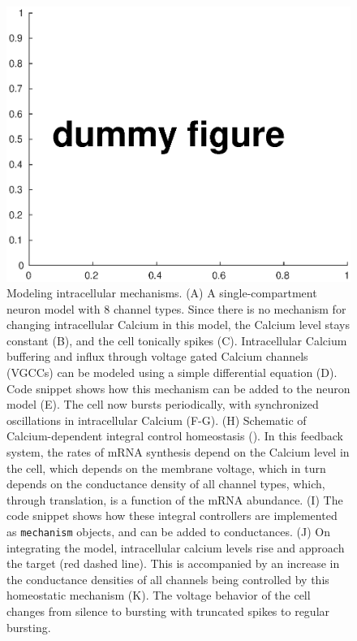 \documentclass{frontiersSCNS} %
\begin{document}
\begin{figure}[!htb]
	\centering
	\includegraphics[width=1.0\linewidth]{gfx/figure_mechanism}
	\caption{Modeling intracellular mechanisms. (A) A single-compartment neuron model with 8 channel types. Since there is no mechanism for changing intracellular Calcium in this model, the Calcium level stays constant (B), and the cell tonically spikes (C). Intracellular Calcium buffering and influx through voltage gated Calcium channels (VGCCs) can be modeled using a simple differential equation (D). Code snippet shows how this mechanism can be added to the neuron model (E). The cell now bursts periodically, with synchronized oscillations in intracellular Calcium (F-G). (H) Schematic of Calcium-dependent integral control homeostasis (\cite{olearyCellTypesNetwork2014}). In this feedback system, the rates of mRNA synthesis depend on the Calcium level in the cell, which depends on the membrane voltage, which in turn depends on the conductance density of all channel types, which, through translation, is a function of the mRNA abundance. (I) The code snippet shows how these integral controllers are implemented as \texttt{mechanism} objects, and can be added to conductances. (J) On integrating the model, intracellular calcium levels rise and approach the target (red dashed line). This is accompanied by an increase in the conductance densities of all channels being controlled by this homeostatic mechanism (K). The voltage behavior of the cell changes from silence to bursting with truncated spikes to regular bursting.}
	\label{fig:figuremechanism}
\end{figure}
\end{document}
